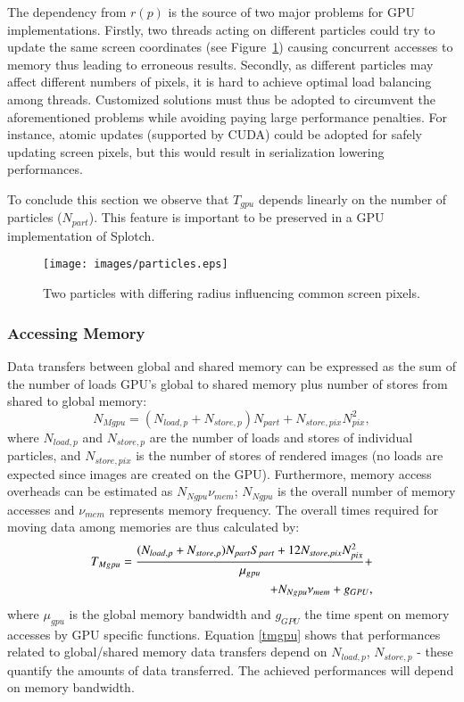 \documentclass[1p]{elsarticle}
\begin{document}
The dependency from $r(p)$ is the source of two major problems for GPU implementations. Firstly, two threads acting on different particles could try 
to update the same screen coordinates (see Figure~\ref{fig:particles}) causing concurrent accesses to memory thus leading to erroneous results. 
Secondly, as different particles may affect different numbers of pixels, it is hard to achieve optimal load balancing among threads.  
Customized solutions must thus be adopted to circumvent the aforementioned problems while avoiding paying large performance penalties. For instance, atomic updates (supported by CUDA) could be adopted for safely updating screen pixels, but this would result in serialization lowering performances. 

To conclude this section we observe that $T_{gpu}$ depends linearly on the number of particles ($N_{part}$). This feature is important to be preserved in a GPU implementation of Splotch.

\begin{figure}
\centering
\texttt{[image: images/particles.eps]}
\caption{Two particles with differing radius influencing common screen pixels.}
\label{fig:particles}
\end{figure}


\subsubsection{Accessing Memory}
Data transfers between global and shared memory can be expressed 
as the sum of the number of loads 
GPU's global to shared memory plus number of stores from shared to global memory:
\begin{equation}
N_{Mgpu} = (N_{load,p} + N_{store,p}) N_{part} + N_{store,pix} N_{pix}^2,
\end{equation}
where $N_{load,p}$ and $N_{store,p}$ are the number of loads and stores of individual 
particles, and $N_{store,pix}$ is the number of stores of rendered images (no loads 
are expected since images are created on the GPU). 
Furthermore, memory access overheads can be estimated as $N_{Ngpu} \nu_{mem}$; $N_{Ngpu}$ is the overall number of memory accesses and $\nu_{mem}$ represents memory frequency. The overall times required for moving data among memories are thus calculated by:
\begin{equation}\label{tmgpu}
\begin{split}
T_{Mgpu} = {(N_{load,p} + N_{store,p}) N_{part} S_{part}
+ 12 N_{store,pix} N_{pix}^2\over \mu_{gpu}} + \\
+ N_{Ngpu} \nu_{mem} + g_{GPU},
\end{split}
\end{equation}
where $\mu_{gpu}$ is the global memory bandwidth
and $g_{GPU}$ the time 
spent on memory accesses by GPU specific functions. Equation \eqref{tmgpu} shows that performances related to global/shared memory data transfers depend on $N_{load,p}$, $N_{store,p}$ - these quantify the amounts of data transferred. The achieved performances will depend on memory bandwidth.
\end{document}
